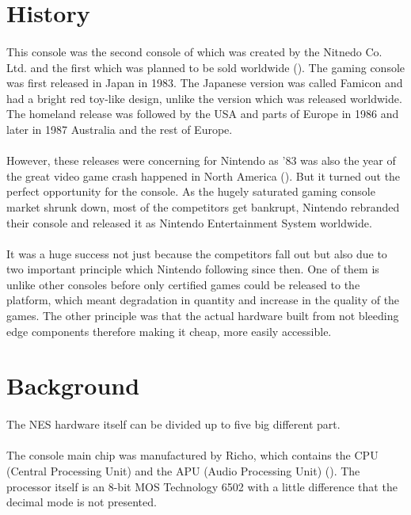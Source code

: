 \documentclass[]{report}
\begin{document}
\section{History}

\paragraph{ }
 This console was the second console of which was created by the Nitnedo Co. Ltd. and the first which was planned to be sold worldwide (\cite{HIST}).
The gaming console was first released in Japan in 1983. The Japanese version was called Famicon and had a bright red toy-like design, unlike the version which was released worldwide.
The homeland release was followed by the USA and parts of Europe in 1986 and later in 1987 Australia and the rest of Europe.
\paragraph{ }
However, these releases were concerning for Nintendo as '83 was also the year of the great video game crash happened in North America (\cite{CRSH}). But it turned out the perfect opportunity for the console. As the hugely saturated gaming console market shrunk down, most of the competitors get bankrupt, Nintendo rebranded their console and released it as Nintendo Entertainment System worldwide.
\paragraph{ }
 It was a huge success not just because the competitors fall out but also due to two important principle which Nintendo following since then. One of them is unlike other consoles before only certified games could be released to the platform, which meant degradation in quantity and increase in the quality of the games. The other principle was that the actual hardware built from not bleeding edge components therefore making it cheap, more easily accessible.

\section{Background}
\paragraph{ }
The NES hardware itself can be divided up to five big different part. 
\paragraph{ }
The console main chip was manufactured by Richo, which contains the CPU (Central Processing Unit) and the APU (Audio Processing Unit) (\cite{CPU}).  
The processor itself is an 8-bit MOS Technology 6502 with a little difference that the decimal mode is not presented. 
\end{document}
